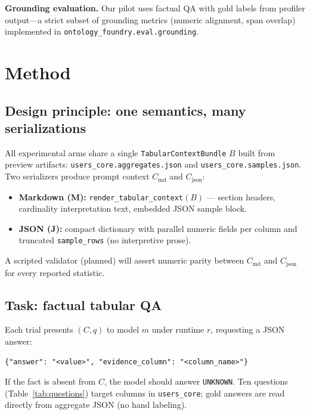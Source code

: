 \documentclass[11pt,a4paper]{article}
\begin{document}
\textbf{Grounding evaluation.} Our pilot uses factual QA with gold labels from profiler output---a strict subset of grounding metrics (numeric alignment, span overlap) implemented in \texttt{ontology\_foundry.eval.grounding}.

\section{Method}
\label{sec:method}

\subsection{Design principle: one semantics, many serializations}
All experimental arms share a single \texttt{TabularContextBundle} $B$ built from preview artifacts:
\texttt{users\_core.aggregates.json} and \texttt{users\_core.samples.json}.
Two serializers produce prompt context $C_{\mathrm{md}}$ and $C_{\mathrm{json}}$:
\begin{itemize}[leftmargin=*]
  \item \textbf{Markdown (M):} \texttt{render\_tabular\_context}$(B)$ --- section headers, cardinality interpretation text, embedded JSON sample block.
  \item \textbf{JSON (J):} compact dictionary with parallel numeric fields per column and truncated \texttt{sample\_rows} (no interpretive prose).
\end{itemize}
A scripted validator (planned) will assert numeric parity between $C_{\mathrm{md}}$ and $C_{\mathrm{json}}$ for every reported statistic.

\subsection{Task: factual tabular QA}
Each trial presents $(C, q)$ to model $m$ under runtime $r$, requesting a JSON answer:
\begin{lstlisting}
{"answer": "<value>", "evidence_column": "<column_name>"}
\end{lstlisting}
If the fact is absent from $C$, the model should answer \texttt{UNKNOWN}.
Ten questions (Table~\ref{tab:questions}) target columns in \texttt{users\_core}; gold answers are read directly from aggregate JSON (no hand labeling).
\end{document}
